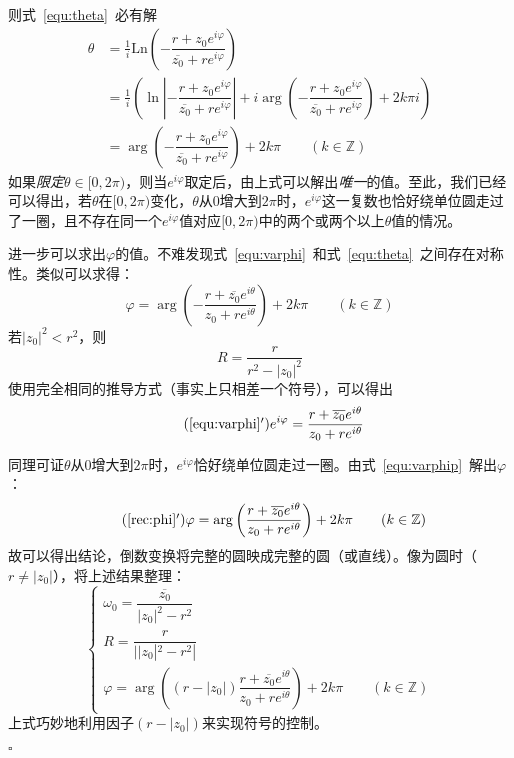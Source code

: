 \documentclass{article}
\newenvironment{SOLUTION}[1][{}]{{\noindent\heiti 解#1：}}{\hfill $\square$\par}
\newcommand{\Ln}{\mathrm{Ln}}
\begin{document}
\begin{SOLUTION}
\begin{enumerate}
    则式~\eqref{equ:theta}~必有解
    \begin{equation}
    \begin{split}
    \theta &= \frac{1}{i}\Ln\left(-\dfrac{r+z_0e^{i\varphi}}{\overline{z_0}+re^{i\varphi}}\right)\\
    &=\frac{1}{i}\left(\ln\left|-\dfrac{r+z_0e^{i\varphi}}{\overline{z_0}+re^{i\varphi}}\right|+i\arg \left(-\dfrac{r+z_0e^{i\varphi}}{\overline{z_0}+re^{i\varphi}}\right)+2k\pi i\right)\\
    &=\arg \left(-\dfrac{r+z_0e^{i\varphi}}{\overline{z_0}+re^{i\varphi}}\right)+2k\pi\qquad (k\in \mathbb{Z}) 
    \end{split}
    \end{equation}
    如果\textit{限定}$\theta\in [0,2\pi)$，则当$e^{i\varphi}$取定后，由上式可以解出\textit{唯一}的值。至此，我们已经可以得出，若$\theta$在$[0,2\pi)$变化，$\theta$从0增大到$2\pi $时，$e^{i\varphi}$这一复数也恰好绕单位圆走过了一圈，且不存在同一个$e^{i\varphi}$值对应$[0,2\pi)$中的两个或两个以上$\theta$值的情况。
    
    进一步可以求出$\varphi$的值。不难发现式~\eqref{equ:varphi}~和式~\eqref{equ:theta}~之间存在对称性。类似可以求得：
    \begin{equation}
    \varphi = 
    \arg \left(-\dfrac{r+\overline{z_0}e^{i\theta}}{z_0+re^{i\theta}}\right)+2k\pi\qquad (k\in \mathbb{Z}) 
    \label{rec:phi}
    \end{equation}
    若$|z_0|^2<r^2$，则
    $$R=\dfrac{r}{r^2-|z_0|^2}$$
    使用完全相同的推导方式（事实上只相差一个符号），可以得出
    \begin{equation}
        \tag{\ref{equ:varphi}$'$}
        e^{i\varphi}=\dfrac{r+\overline{z_0}e^{i\theta}}{z_0+re^{i\theta}}
        \label{equ:varphip}
        \end{equation}


        同理可证$\theta$从0增大到$2\pi$时，$e^{i\varphi}$恰好绕单位圆走过一圈。由式~\eqref{equ:varphip}~解出$\varphi$：
        \begin{equation}
            \tag{\ref{rec:phi}$'$}
            \varphi =
            \arg \left(\dfrac{r+\overline{z_0}e^{i\theta}}{z_0+re^{i\theta}}\right)+2k\pi\qquad (k\in \mathbb{Z})\label{rec:phi'}
            \end{equation}
    故可以得出结论，倒数变换将完整的圆映成完整的圆（或直线）。像为圆时（$r\neq |z_0|$），将上述结果整理：
    \begin{equation}
    \begin{cases}
    \omega_0=\dfrac{\overline{z_0}}{|z_0|^2-r^2}\\[3ex]
    R=\dfrac{r}{||z_0|^2-r^2|}\\[3ex]
    \varphi = 
    \arg \left((r-|z_0|)\dfrac{r+\overline{z_0}e^{i\theta}}{z_0+re^{i\theta}}\right)+2k\pi\qquad (k\in \mathbb{Z}) 
    \end{cases}
    \label{equ:reciprocal}
    \end{equation}
    上式巧妙地利用因子$(r-|z_0|)$来实现符号的控制。


\end{enumerate}
\end{SOLUTION}
\end{document}
